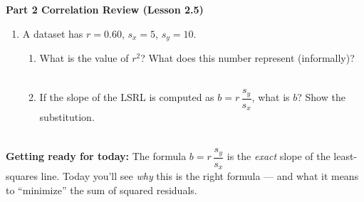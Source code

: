 \documentclass[10pt]{article}
\begin{document}
{\large\bfseries\color{navy} Part 2 \quad Correlation Review (Lesson 2.5)}

\vspace{0.12in}

\begin{enumerate}[leftmargin=1.6em, itemsep=0.18in, start=3]

  \item A dataset has $r = 0.60$, $s_x = 5$, $s_y = 10$.

        \begin{enumerate}[label=\textbf{(\alph*)}, leftmargin=1.6em, itemsep=6pt]
          \item What is the value of $r^2$? \blank{3cm} What does this number represent (informally)?\\[8pt]
                \writeline\\[1pt]\writeline

          \item If the slope of the LSRL is computed as $b = r\,\dfrac{s_y}{s_x}$, what is $b$?
                Show the substitution.\\[8pt]
                \writeline\\[1pt]\writeline
        \end{enumerate}

\end{enumerate}

\vspace{0.14in}

\begin{tcolorbox}[colback=greenbg, colframe=greenacc, boxrule=0.8pt, arc=2mm,
    left=4mm, right=4mm, top=3mm, bottom=3mm]
\small\textbf{Getting ready for today:} The formula $b = r\,\dfrac{s_y}{s_x}$ is the
\emph{exact} slope of the least-squares line. Today you'll see \emph{why} this is the right
formula --- and what it means to ``minimize'' the sum of squared residuals.
\end{tcolorbox}
\end{document}
